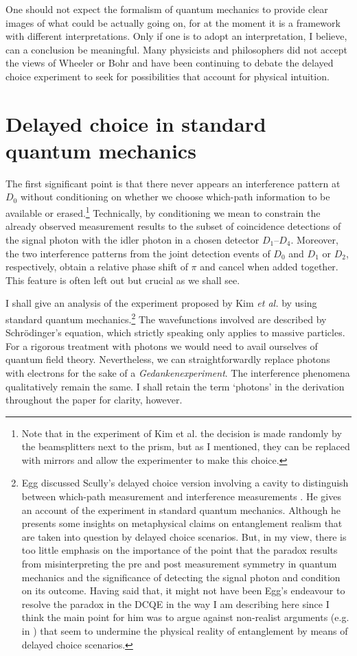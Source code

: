 \documentclass[11pt]{article}
\numberwithin{equation}{section}
\begin{document}
One should not expect the formalism of quantum mechanics to provide clear images of what could be actually going on, for at the moment it is a framework with different interpretations. Only if one is to adopt an interpretation, I believe, can a conclusion be meaningful. Many physicists and philosophers did not accept the views of Wheeler or Bohr and have been continuing to debate the delayed choice experiment to seek for possibilities that account for physical intuition. 

\section{Delayed choice in standard quantum mechanics}

The first significant point is that there never appears an interference pattern at $D_0$ without conditioning on whether we choose which-path information to be available or erased.\footnote{Note that in the experiment of Kim et al. the decision is made randomly by the beamsplitters next to the prism, but as I mentioned, they can be replaced with mirrors and allow the experimenter to make this choice.} Technically, by conditioning we mean to constrain the already observed measurement results to the subset of coincidence detections of the signal photon with the idler photon in a chosen detector $D_1$--$D_4$.  Moreover,  the two interference patterns from the joint detection events of $D_0$ and $D_1$ or $D_2$, respectively, obtain a relative phase shift of $\pi$ and cancel when added together. This feature is often left out but crucial as we shall see.    

I shall give an analysis of the experiment proposed by Kim \textit{et al.} by using standard quantum mechanics.\footnote{Egg discussed Scully's delayed choice version involving a cavity to distinguish between which-path measurement and interference measurements \cite{Egg2013}. He gives an account of the experiment in standard quantum mechanics. Although he presents some insights on metaphysical claims on entanglement realism that are taken into question by delayed choice scenarios. But, in my view, there is too little emphasis on the importance of the point that the paradox results from misinterpreting the pre and post measurement symmetry in quantum mechanics and the significance of detecting the signal photon and condition on its outcome. Having said that, it might not have been Egg's endeavour to resolve the paradox in the DCQE in the way I am describing here since I think the main point for him was to argue against non-realist arguments (e.g. in \cite{healey2012quantum}) that seem to undermine the physical reality of entanglement by means of delayed choice scenarios.} The wavefunctions involved are described by Schrödinger's equation, which strictly speaking only applies to massive particles. For a rigorous treatment with photons we would need to avail ourselves of quantum field theory. Nevertheless, we can straightforwardly replace photons with electrons for the sake of a \textit{Gedankenexperiment}. The interference phenomena qualitatively remain the same. I shall retain the term `photons' in the derivation throughout the paper for clarity, however. 
\end{document}
